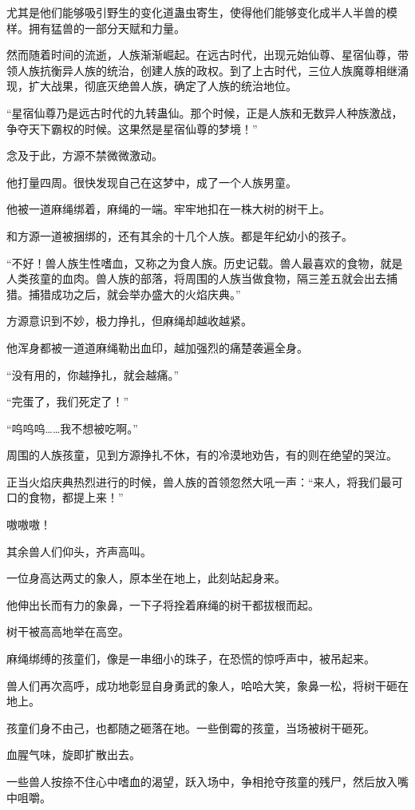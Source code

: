 \begin{this_body}
尤其是他们能够吸引野生的变化道蛊虫寄生，使得他们能够变化成半人半兽的模样。拥有猛兽的一部分天赋和力量。

然而随着时间的流逝，人族渐渐崛起。在远古时代，出现元始仙尊、星宿仙尊，带领人族抗衡异人族的统治，创建人族的政权。到了上古时代，三位人族魔尊相继涌现，扩大战果，彻底灭绝兽人族，确定了人族的统治地位。

“星宿仙尊乃是远古时代的九转蛊仙。那个时候，正是人族和无数异人种族激战，争夺天下霸权的时候。这果然是星宿仙尊的梦境！”

念及于此，方源不禁微微激动。

他打量四周。很快发现自己在这梦中，成了一个人族男童。

他被一道麻绳绑着，麻绳的一端。牢牢地扣在一株大树的树干上。

和方源一道被捆绑的，还有其余的十几个人族。都是年纪幼小的孩子。

“不好！兽人族生性嗜血，又称之为食人族。历史记载。兽人最喜欢的食物，就是人类孩童的血肉。兽人族的部落，将周围的人族当做食物，隔三差五就会出去捕猎。捕猎成功之后，就会举办盛大的火焰庆典。”

方源意识到不妙，极力挣扎，但麻绳却越收越紧。

他浑身都被一道道麻绳勒出血印，越加强烈的痛楚袭遍全身。

“没有用的，你越挣扎，就会越痛。”

“完蛋了，我们死定了！”

“呜呜呜……我不想被吃啊。”

周围的人族孩童，见到方源挣扎不休，有的冷漠地劝告，有的则在绝望的哭泣。

正当火焰庆典热烈进行的时候，兽人族的首领忽然大吼一声：“来人，将我们最可口的食物，都提上来！”

嗷嗷嗷！

其余兽人们仰头，齐声高叫。

一位身高达两丈的象人，原本坐在地上，此刻站起身来。

他伸出长而有力的象鼻，一下子将拴着麻绳的树干都拔根而起。

树干被高高地举在高空。

麻绳绑缚的孩童们，像是一串细小的珠子，在恐慌的惊呼声中，被吊起来。

兽人们再次高呼，成功地彰显自身勇武的象人，哈哈大笑，象鼻一松，将树干砸在地上。

孩童们身不由己，也都随之砸落在地。一些倒霉的孩童，当场被树干砸死。

血腥气味，旋即扩散出去。

一些兽人按捺不住心中嗜血的渴望，跃入场中，争相抢夺孩童的残尸，然后放入嘴中咀嚼。


\end{this_body}

